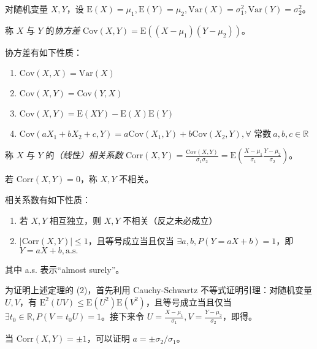 \documentclass[../main.tex]{subfiles}
\begin{document}
对随机变量 $X,Y$，设 $\mathrm E(X)=\mu_1,\mathrm E(Y)=\mu_2,\mathrm{Var}(X)=\sigma_1^2,\mathrm{Var}(Y)=\sigma_2^2$。

\begin{definition}\label{def:4.4.1}
    称 $X$ 与 $Y$ 的\emph{协方差} $\mathrm{Cov}(X,Y)=\mathrm E((X-\mu_1)(Y-\mu_2))$。
\end{definition}

\begin{proposition}
    协方差有如下性质：
    \begin{enumerate}
        \item $\mathrm{Cov}(X,X)=\mathrm{Var}(X)$
        \item $\mathrm{Cov}(X,Y)=\mathrm{Cov}(Y,X)$
        \item $\mathrm{Cov}(X,Y)=\mathrm E(XY)-\mathrm E(X)\mathrm E(Y)$
        \item $\mathrm{Cov}(aX_1+bX_2+c,Y)=a\mathrm{Cov}(X_1,Y)+b\mathrm{Cov}(X_2,Y),\forall\text{ 常数}\ a,b,c\in\mathbb R$
    \end{enumerate}
\end{proposition}

\begin{definition}\label{def:4.4.2}
    称 $X$ 与 $Y$ 的\emph{（线性）相关系数} $\mathrm{Corr}(X,Y)=\frac{\mathrm{Cov}(X,Y)}{\sigma_1\sigma_2}=\mathrm E(\frac{X-\mu_1}{\sigma_1}\frac{Y-\mu_2}{\sigma_2})$。
\end{definition}

若 $\mathrm{Corr}(X,Y)=0$，称 $X,Y$ 不相关。

\begin{theorem}\label{thm:4.4.1}
    相关系数有如下性质：
    \begin{enumerate}
        \item 若 $X,Y$ 相互独立，则 $X,Y$ 不相关（反之未必成立）
        \item $|\mathrm{Corr}(X,Y)|\leq1$，且等号成立当且仅当 $\exists a,b,P(Y=aX+b)=1$，即 $Y=aX+b,\mathrm{a.s.}$
    \end{enumerate}
\end{theorem}

其中 a.s. 表示“almost surely”。

为证明上述定理的 (2)，首先利用 Cauchy-Schwartz 不等式证明引理：对随机变量 $U,V$，有 $\mathrm{E}^2(UV)\leq \mathrm{E}(U^2)\mathrm{E}(V^2)$，且等号成立当且仅当 $\exists t_0\in\mathbb R,P(V=t_0U)=1$。接下来令 $U=\frac{X-\mu_1}{\sigma_1},V=\frac{Y-\mu_2}{\sigma_2}$，即得。

当 $\mathrm{Corr}(X,Y)=\pm1$，可以证明 $a=\pm\sigma_2/\sigma_1$。
\end{document}
